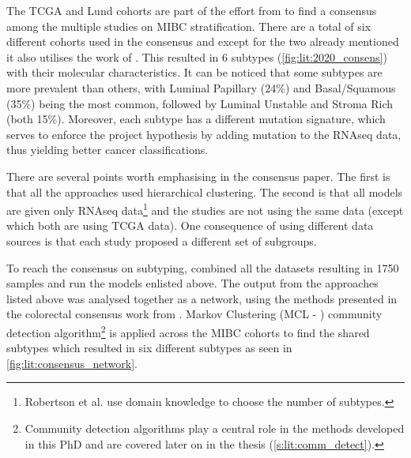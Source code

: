 The TCGA and Lund cohorts are part of the effort from \citet{Kamoun2020-tj} to find a consensus among the multiple studies on MIBC stratification. There are a total of six different cohorts used in the consensus and except for the two already mentioned \citet{Kamoun2020-tj} it also utilises the work of \citet{Mo2018-rl, Damrauer2014-tc, Choi2014-ed, Rebouissou2014-ep}. This resulted in 6 subtypes (\cref{fig:lit:2020_consens}) with their molecular characteristics. It can be noticed that some subtypes are more prevalent than others, with Luminal Papillary (24\%) and Basal/Squamous (35\%) being the most common, followed by Luminal Unstable and Stroma Rich (both 15\%). Moreover, each subtype has a different mutation signature, which serves to enforce the project hypothesis by adding mutation to the RNAseq data, thus yielding better cancer classifications.

There are several points worth emphasising in the consensus paper. The first is that all the approaches\cite{Mo2018-rl, Damrauer2014-tc, Choi2014-ed, Marzouka2018-ge, Rebouissou2014-ep,Robertson2017-mg}  used hierarchical clustering. The second is that all models are given only RNAseq data\footnote{Robertson et al. use domain knowledge to choose the number of subtypes.} and the studies are not using the same data (except \cite{Robertson2017-mg, Mo2018-rl} which both are using TCGA data). One consequence of using different data sources is that each study proposed a different set of subgroups. 

To reach the consensus on subtyping, \citet{Kamoun2020-tj} combined all the datasets resulting in 1750 samples and run the models enlisted above. The output from the approaches listed above was analysed together as a network, using the methods presented in the colorectal consensus work from \citet{Guinney2015-fy}. Markov Clustering (MCL - \citet{Van_Dongen2008-yj}) community detection algorithm\footnote{Community detection algorithms play a central role in the methods developed in this PhD and are covered later on in the thesis (\cref{s:lit:comm_detect}).} is applied  across the MIBC cohorts to find the shared subtypes which resulted in six different subtypes as seen in \cref{fig:lit:consensus_network}. 


